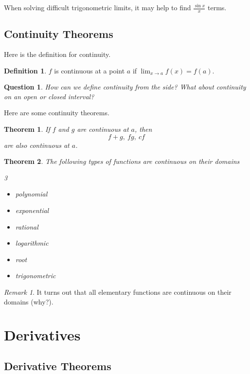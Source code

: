 \documentclass[11pt]{scrartcl}
\theoremstyle{plain}
\newtheorem{theorem}{Theorem}[section]
\newtheorem*{question}{Question}
\theoremstyle{definition}
\newtheorem*{definition}{Definition}
\theoremstyle{remark}
\newtheorem*{remark}{Remark}
\begin{document}
When solving difficult trigonometric limits, it may help to find $\frac{{\sin x}}{x}$ terms.

\subsection{Continuity Theorems}

Here is the definition for continuity.

\begin{definition}
    $f$ is continuous at a point $a$ if $\lim_{ x \to a }f(x)=f(a)$. 
\end{definition}

\begin{question} 
    How can we define continuity from the side? What about continuity on an open or closed interval?
\end{question}

Here are some continuity theorems.

\begin{theorem}
    If $f$ and $g$ are continuous at $a$, then \[ f+g,\ fg,\ cf \] are also continuous at $a$.
\end{theorem}

\begin{theorem}
    The following types of functions are continuous on their domains 
    \begin{multicols}{3}
        \begin{itemize}
            \item polynomial
            \item exponential
            \item rational
            \item logarithmic
            \item root
            \item trigonometric
        \end{itemize}
    \end{multicols}
\end{theorem}

\begin{remark}
    It turns out that all elementary functions are continuous on their domains (why?).
\end{remark}

\newpage
\section{Derivatives}
\subsection{Derivative Theorems}
\end{document}
